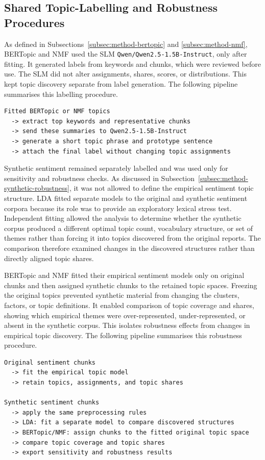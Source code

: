 \subsection{Shared Topic-Labelling and Robustness Procedures}
\label{subsec:impl-topic-labelling}

As defined in Subsections~\ref{subsec:method-bertopic} and \ref{subsec:method-nmf},
BERTopic and NMF used the SLM \texttt{Qwen/Qwen2.5-1.5B-Instruct},
only after fitting. It generated labels from keywords and chunks,
which were reviewed before use. The SLM did not alter assignments, shares, scores, or
distributions. This kept topic discovery separate from label generation. The
following pipeline summarises this labelling procedure.

{\small
\begin{verbatim}
Fitted BERTopic or NMF topics
  -> extract top keywords and representative chunks
  -> send these summaries to Qwen2.5-1.5B-Instruct
  -> generate a short topic phrase and prototype sentence
  -> attach the final label without changing topic assignments
\end{verbatim}
}

Synthetic sentiment remained separately labelled and was used only for sensitivity
and robustness checks. As discussed in
Subsection~\ref{subsec:method-synthetic-robustness}, it was not allowed to define the
empirical sentiment topic structure. LDA fitted separate models to the original and
synthetic sentiment corpora because its role was to provide an exploratory lexical
stress test. Independent fitting allowed the analysis to determine whether the
synthetic corpus produced a different optimal topic count, vocabulary structure, or
set of themes rather than forcing it into topics discovered from the original
reports. The comparison therefore examined changes in the discovered structures
rather than directly aligned topic shares.

BERTopic and NMF fitted their empirical sentiment models only on original
chunks and then assigned synthetic chunks to the retained topic spaces. Freezing the
original topics prevented synthetic material from changing the clusters, factors, or
topic definitions. It enabled comparison of topic coverage and shares,
showing which empirical themes were over-represented, under-represented, or absent in
the synthetic corpus. This isolates robustness effects from changes in empirical
topic discovery. The following pipeline summarises this robustness procedure.


{\small
\begin{verbatim}
Original sentiment chunks
  -> fit the empirical topic model
  -> retain topics, assignments, and topic shares

Synthetic sentiment chunks
  -> apply the same preprocessing rules
  -> LDA: fit a separate model to compare discovered structures
  -> BERTopic/NMF: assign chunks to the fitted original topic space
  -> compare topic coverage and topic shares
  -> export sensitivity and robustness results
\end{verbatim}
}


